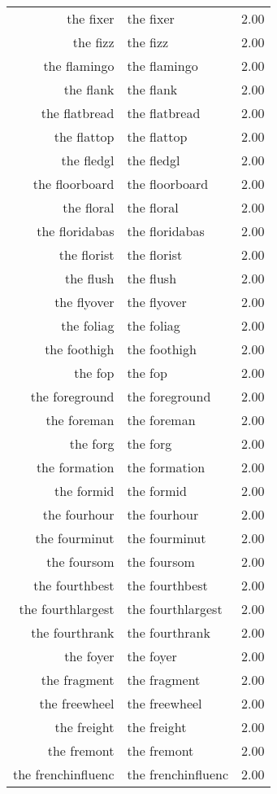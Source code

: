 \begin{table}[ht]
\begin{tabular}{rlr}
  the fixer & the fixer & 2.00 \\ 
  the fizz & the fizz & 2.00 \\ 
  the flamingo & the flamingo & 2.00 \\ 
  the flank & the flank & 2.00 \\ 
  the flatbread & the flatbread & 2.00 \\ 
  the flattop & the flattop & 2.00 \\ 
  the fledgl & the fledgl & 2.00 \\ 
  the floorboard & the floorboard & 2.00 \\ 
  the floral & the floral & 2.00 \\ 
  the floridabas & the floridabas & 2.00 \\ 
  the florist & the florist & 2.00 \\ 
  the flush & the flush & 2.00 \\ 
  the flyover & the flyover & 2.00 \\ 
  the foliag & the foliag & 2.00 \\ 
  the foothigh & the foothigh & 2.00 \\ 
  the fop & the fop & 2.00 \\ 
  the foreground & the foreground & 2.00 \\ 
  the foreman & the foreman & 2.00 \\ 
  the forg & the forg & 2.00 \\ 
  the formation & the formation & 2.00 \\ 
  the formid & the formid & 2.00 \\ 
  the fourhour & the fourhour & 2.00 \\ 
  the fourminut & the fourminut & 2.00 \\ 
  the foursom & the foursom & 2.00 \\ 
  the fourthbest & the fourthbest & 2.00 \\ 
  the fourthlargest & the fourthlargest & 2.00 \\ 
  the fourthrank & the fourthrank & 2.00 \\ 
  the foyer & the foyer & 2.00 \\ 
  the fragment & the fragment & 2.00 \\ 
  the freewheel & the freewheel & 2.00 \\ 
  the freight & the freight & 2.00 \\ 
  the fremont & the fremont & 2.00 \\ 
  the frenchinfluenc & the frenchinfluenc & 2.00 \\ 

\end{tabular}
\end{table}
